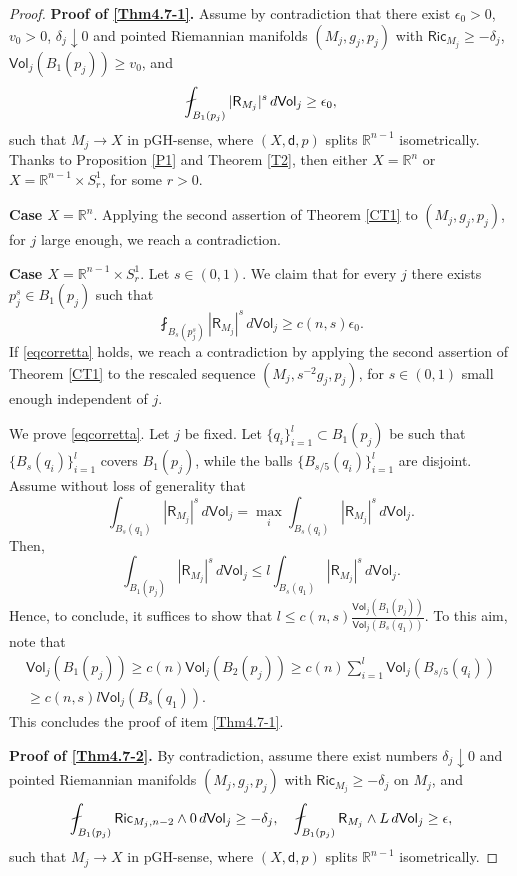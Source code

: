 \documentclass[10pt,a4paper]{amsart}
\newcommand{\R}{\mathsf{R}}
\newcommand{\Ric}{\mathsf{Ric}}
\newcommand{\bb}[1]{\mathbb{#1}}
\newcommand{\de}{{\rm d}}
\newcommand{\sd}{\mathsf{d}}
\newcommand{\ssf}[1]{\mathsf{#1}}
\begin{document}
\begin{proof} 
\textbf{Proof of \ref{Thm4.7-1}.}
Assume by contradiction that there exist $\epsilon_0>0$, $v_0>0$, $\delta_j \downarrow 0$ and pointed Riemannian manifolds $(M_j,g_j,p_j)$ with $\Ric_{M_j} \geq -\delta_j$, $\ssf{Vol}_j(B_1(p_j)) \geq v_0$, and
\[
\fint_{B_1(p_j)}|\R_{M_j}|^s \, \de \ssf{Vol}_j \geq \epsilon_0,
\]
such that
$M_j \to X$ in  pGH-sense, where $(X,\sd,p)$ splits $\bb{R}^{n-1}$ isometrically.
Thanks to Proposition \ref{P1} and Theorem \ref{T2}, then either $X=\bb{R}^n$ or $X=\bb{R}^{n-1} \times S^1_r$, for some $r>0$. 
\smallskip

\textbf{Case $X=\bb{R}^n$}.
Applying the second assertion of Theorem \ref{CT1} to $(M_j, g_j, p_j)$, for $j$ large enough, we reach a contradiction.

\smallskip
\textbf{Case $X=\bb{R}^{n-1} \times S^1_r$}.  
Let $s \in (0,1)$. We claim that for every $j$ there exists $p_j^s \in B_1(p_j)$ such that
\begin{equation} \label{eqcorretta}
\fint_{B_s(p_j^s)} |\R_{M_j}|^s \, d\ssf{Vol}_j \geq c(n,s)\epsilon_0.
\end{equation}
If \eqref{eqcorretta} holds, we reach a contradiction by applying the second assertion of Theorem \ref{CT1} to the rescaled sequence $(M_j, s^{-2} g_j, p_j)$, for $s \in (0,1)$ small enough independent of $j$.

We prove \eqref{eqcorretta}. Let $j$ be fixed. Let $\{q_i\}_{i=1}^l \subset B_1(p_j)$ be such that $\{B_s(q_i)\}_{i=1}^l$ covers $B_1(p_j)$, while the balls $\{B_{s/5}(q_i)\}_{i=1}^l$ are disjoint. Assume without loss of generality that
\[
\int_{B_s(q_1)}|\R_{M_j}|^s \, d\ssf{Vol}_j=\max_{i}\int_{B_s(q_i)}|\R_{M_j}|^s \, d\ssf{Vol}_j.
\]
Then,
\[
\int_{B_1(p_j)}|\R_{M_j}|^s \, d\ssf{Vol}_j \leq l \int_{B_s(q_1)}|\R_{M_j}|^s \, d\ssf{Vol}_j.
\]
Hence, to conclude, it suffices to show that $l \leq c(n,s)\frac{\ssf{Vol}_j(B_1(p_j))}{\ssf{Vol}_j(B_s(q_1))}$.
To this aim, note that
\begin{align*}
\ssf{Vol}_j(B_1(p_j))  \geq c(n)\ssf{Vol}_j(B_2(p_j)) \geq c(n)\sum_{i=1}^l \ssf{Vol}_j(B_{s/5}(q_i)) \\
 \geq c(n,s)l\ssf{Vol}_j(B_s(q_1)).
\end{align*}
This concludes the proof of item \ref{Thm4.7-1}.
\smallskip

\textbf{Proof of \ref{Thm4.7-2}.}
By contradiction, assume there exist numbers $\delta_j \downarrow 0$ and pointed Riemannian manifolds $(M_j,g_j,p_j)$ with $\Ric_{M_j} \geq -\delta_j$ on $M_j$, and
\begin{equation} \label{E4}
\fint_{B_1(p_j)} \ssf{Ric}_{M_j,n-2} \wedge 0 \, \de \ssf{Vol}_j  \geq -\delta_j, \quad 
\fint_{B_1(p_j)}\R_{M_j} \wedge L \, \de \ssf{Vol}_j \geq \epsilon,
\end{equation}
such that
$M_j \to X$ in pGH-sense, where $(X,\sd,p)$ splits $\bb{R}^{n-1}$ isometrically. 


\end{proof}
\end{document}
